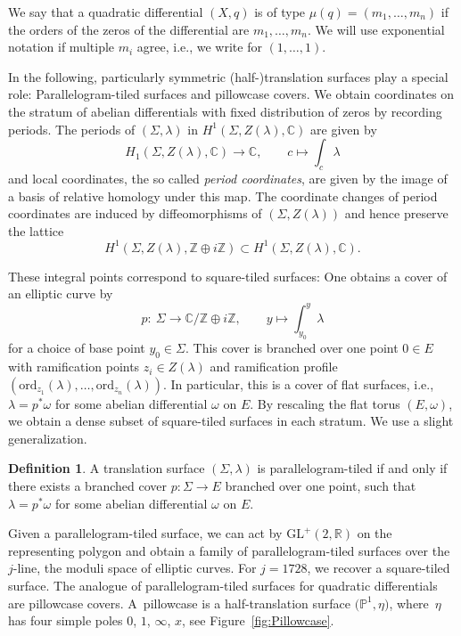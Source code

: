 \documentclass[pdftex]{sigma}
\numberwithin{equation}{section}
\theoremstyle{definition}
\newtheorem{defi}[theo]{Definition}
\newcommand{\ord}{\mathrm{ord}}
\renewcommand{\to}{\rightarrow}
\newcommand{\ZZ}{\mathbb{Z}}
\newcommand{\RR}{\mathbb{R}}
\newcommand{\CC}{\mathbb{C}}
\newcommand{\PP}{\mathbb{P}}
\newcommand{\GL}{\mathrm{GL}}
\begin{document}
We say that a quadratic differential $(X,q)$ is of type $\mu(q) = (m_1,\dots,m_n)$ if the orders of the zeros of the differential are $m_1,\dots,m_n$.
We will use exponential notation if multiple $m_i$ agree, i.e., we write  for $(1, \dots, 1)$.

In the following, particularly symmetric (half-)translation surfaces play a special role: Para\-llelo\-gram-tiled surfaces and pillowcase covers. We obtain coordinates on the stratum of abelian differentials with fixed distribution of zeros by recording periods. The periods of $(\Sigma,\lambda)$ in $H^1(\Sigma,Z(\lambda),\CC)$ are given by
\[ H_1(\Sigma, Z(\lambda),\CC) \to \CC, \qquad c \mapsto \int_c \lambda
\]
and local coordinates, the so called \emph{period coordinates}, are given by the image of a basis of relative homology under this map.
The coordinate changes of period coordinates are induced by diffeomorphisms of $(\Sigma,Z(\lambda))$ and hence preserve the lattice
\[ H^1(\Sigma, Z(\lambda), \ZZ \oplus i \ZZ) \subset H^1(\Sigma,Z(\lambda),\CC).
\]

These integral points correspond to square-tiled surfaces: One obtains a cover of an elliptic curve by
\[ p\colon \ \Sigma \to \CC /\ZZ \oplus i\ZZ, \qquad y \mapsto \int_{y_0}^y \lambda
\]
for a choice of base point $y_0 \in \Sigma$. This cover is branched over one point $0 \in E$ with ramification points $z_i \in Z(\lambda)$ and ramification profile $(\ord_{z_1}(\lambda),\dots,\ord_{z_n}(\lambda))$. In particular, this is a cover of flat surfaces, i.e., $\lambda=p^*\omega$ for some abelian differential $\omega$ on $E$. By rescaling the flat torus $(E,\omega)$, we obtain a dense subset of square-tiled surfaces in each stratum. We use a slight generalization.

\begin{defi} A translation surface $(\Sigma, \lambda)$ is parallelogram-tiled if and only if there exists a branched cover $p\colon \Sigma \to E$ branched over one point, such that $\lambda=p^*\omega$ for some abelian differential $\omega$ on $E$.
\end{defi}

Given a parallelogram-tiled surface, we can act by $\GL^+(2,\RR)$ on the representing polygon and obtain a family of parallelogram-tiled surfaces over the $j$-line, the moduli space of elliptic curves. For $j=1728$, we recover a square-tiled surface. The analogue of parallelogram-tiled surfaces for quadratic differentials are pillowcase covers. A~pillowcase is a half-translation surface $\bigl(\PP^1,\eta\bigr)$, where~$\eta$ has four simple poles $0$, $1$, $\infty$, $x$, see Figure~\ref{fig:Pillowcase}.
\end{document}
